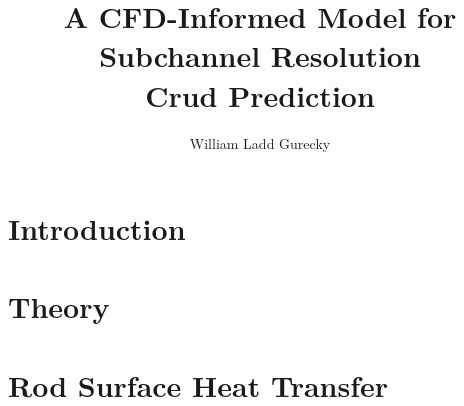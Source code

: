 \documentclass[12pt]{report}
\author{William Ladd Gurecky}
\title{A CFD-Informed Model for Subchannel Resolution \\ Crud Prediction}
\newcommand{\hsp}{\hspace{20pt}}
\begin{document}
\copyrightpage          %
\commcertpage           %
\titlepage              %
	
\renewcommand{\thepage}{\roman{page}}




%

\pagebreak
\tableofcontents
\pagebreak



\titleformat{\chapter}[hang]{\Huge\bfseries}{\thechapter\hsp\textcolor{gray75}{|}\hsp}{0pt}{\Huge\bfseries}
\renewcommand{\thepage}{\arabic{page}} %
\setcounter{page}{1}
\doublespacing  %
%
\chapter{Introduction}
\label{chap:intro}


\chapter{Theory}
\label{chap:theory}


\appendices
\chapter{Rod Surface Heat Transfer}
\label{chap:app_d}


\printindex


\end{document}
